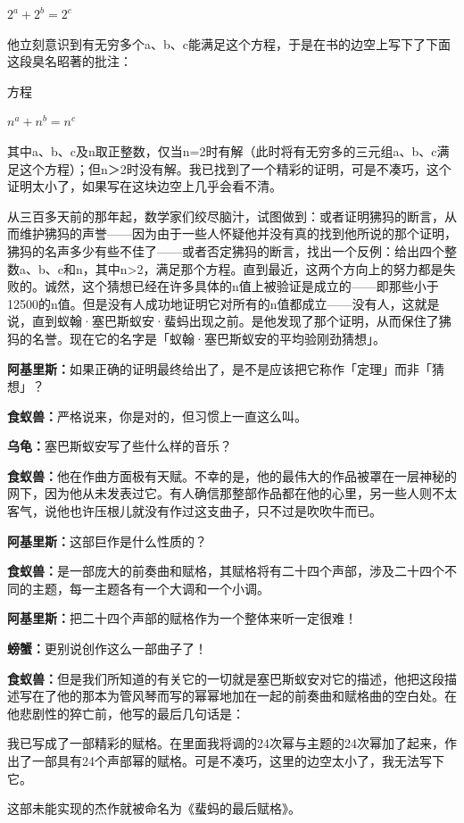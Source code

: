 \documentclass[
  12pt,
  twoside,
  openright,
  oldfontcommands,
]{memoir}
\newcommand{\dialogname}[1]{{\heifamily\bfseries #1}}
\begin{document}
$2^a+2^b=2^c$

他立刻意识到有无穷多个a、b、c能满足这个方程，于是在书的边空上写下了下面这段臭名昭著的批注：

方程

$n^a+n^b=n^c$

其中a、b、c及n取正整数，仅当n=2时有解（此时将有无穷多的三元组a、b、c满足这个方程）；但n＞2时没有解。我已找到了一个精彩的证明，可是不凑巧，这个证明太小了，如果写在这块边空上几乎会看不清。

从三百多天前的那年起，数学家们绞尽脑汁，试图做到：或者证明狒犸的断言，从而维护狒犸的声誉------因为由于一些人怀疑他并没有真的找到他所说的那个证明，狒犸的名声多少有些不佳了------或者否定狒犸的断言，找出一个反例：给出四个整数a、b、c和n，其中n\textgreater2，满足那个方程。直到最近，这两个方向上的努力都是失败的。诚然，这个猜想已经在许多具体的n值上被验证是成立的------即那些小于12500的n值。但是没有人成功地证明它对所有的n值都成立------没有人，这就是说，直到蚁翰·塞巴斯蚁安·蜚蚂出现之前。是他发现了那个证明，从而保住了狒犸的名誉。现在它的名字是「蚁翰·塞巴斯蚁安的平均验刚劲猜想」。

\dialogname{阿基里斯：}如果正确的证明最终给出了，是不是应该把它称作「定理」而非「猜想」？

\dialogname{食蚁兽：}严格说来，你是对的，但习惯上一直这么叫。

\dialogname{乌龟：}塞巴斯蚁安写了些什么样的音乐？

\dialogname{食蚁兽：}他在作曲方面极有天赋。不幸的是，他的最伟大的作品被罩在一层神秘的网下，因为他从未发表过它。有人确信那整部作品都在他的心里，另一些人则不太客气，说他也许压根儿就没有作过这支曲子，只不过是吹吹牛而已。

\dialogname{阿基里斯：}这部巨作是什么性质的？

\dialogname{食蚁兽：}是一部庞大的前奏曲和赋格，其赋格将有二十四个声部，涉及二十四个不同的主题，每一主题各有一个大调和一个小调。

\dialogname{阿基里斯：}把二十四个声部的赋格作为一个整体来听一定很难！

\dialogname{螃蟹：}更别说创作这么一部曲子了！

\dialogname{食蚁兽：}但是我们所知道的有关它的一切就是塞巴斯蚁安对它的描述，他把这段描述写在了他的那本为管风琴而写的幂幂地加在一起的前奏曲和赋格曲的空白处。在他悲剧性的猝亡前，他写的最后几句话是：

我已写成了一部精彩的赋格。在里面我将调的24次幂与主题的24次幂加了起来，作出了一部具有24个声部幂的赋格。可是不凑巧，这里的边空太小了，我无法写下它。

这部未能实现的杰作就被命名为《蜚蚂的最后赋格》。
\end{document}
